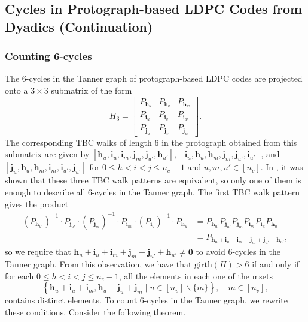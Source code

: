 \documentclass[11pt]{article}
\theoremstyle{plain}
\theoremstyle{plain}
\theoremstyle{definition}
\numberwithin{theo}{section}
\newcommand{\bzero}{\mathbf{0}}
\newcommand{\bh}{{\mathbf h}}
\newcommand{\bi}{{\mathbf i}}
\newcommand{\bj}{{\mathbf j}}
\def\matrix#1{\begin{bmatrix}#1\end{bmatrix}} %
\newcounter{rom}
\begin{document}
\subsection{Cycles in Protograph-based LDPC Codes from Dyadics (Continuation)}
\label{sec:counting_cycles_dyadics_continuation}

\subsubsection{Counting 6-cycles}
\label{counting_cycles_counting_6cycles_dyadics}

The 6-cycles in the Tanner graph of protograph-based LDPC codes are projected onto a $3\times3$ submatrix of the form
\begin{equation*}
H_3=\matrix{P_{\bh_u}&P_{\bh_v}&P_{\bh_w} \\ P_{\bi_u}&P_{\bi_v}&P_{\bi_w} \\ P_{\bj_u}&P_{\bj_v}&P_{\bj_w}}.
\end{equation*}
The corresponding TBC walks of length 6 in the protograph obtained from this submatrix are given by 
$[\bh_u,\bi_u,\bi_m,\bj_m,\bj_{u'},\bh_{u'}]$, $[\bi_u,\bh_u,\bh_m,\bj_m,\bj_{u'},\bi_{u'}]$, and $[\bj_u,\bh_u,\bh_m,\bi_m,\bi_{u'},\bj_{u'}]$ for 
$0\leq h<i<j\leq n_c-1$ and $u,m,u'\in[n_v]$. In \cite{gfsm23c}, it was shown that these three TBC walk patterns are equivalent, so only one of them is enough to describe all 6-cycles in the Tanner graph. The first TBC walk pattern gives the product
\begin{align*}
{\left(P_{\bh_{u'}}\right)}^{-1}\cdot P_{\bj_{u'}}\cdot{\left(P_{\bj_m}\right)}^{-1}\cdot P_{\bi_m}\cdot{\left(P_{\bi_u}\right)}^{-1}\cdot P_{\bh_u} &= P_{\bh_{u'}} P_{\bj_{u'}} P_{\bj_m} P_{\bi_m} P_{\bi_u} P_{\bh_u} \\
&= P_{\bh_u+\bi_u+\bi_m+\bj_m+\bj_{u'}+\bh_{u'}},
\end{align*}
so we require that 
$\bh_u+\bi_u+\bi_m+\bj_m+\bj_{u'}+\bh_{u'}\neq\bzero$ to avoid 6-cycles in the Tanner graph. From this observation, we have that $\text{girth}(H)>6$ if and only if for each %
$0\leq h<i<j\leq n_c-1$, all the elements in each one of the msets
\begin{equation*}
\left\{\bh_u+\bi_u+\bi_m,\bh_u+\bj_u+\bj_m \mid u\in[n_v]\backslash\{m\} \right\}, \quad m\in[n_v],
\end{equation*}
contains distinct elements. To count 6-cycles in the Tanner graph, we rewrite these conditions. Consider the following theorem.
\end{document}
